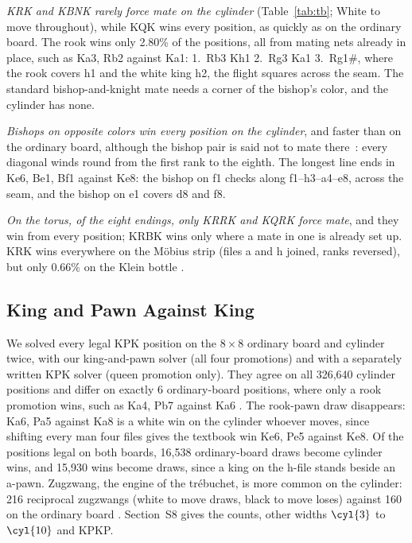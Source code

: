 \emph{KRK and KBNK rarely force mate on the cylinder} (Table~\ref{tab:tb}; White to move throughout), while KQK wins every position, as
quickly as on the ordinary board. The rook wins only 2.80\% of the positions, all from mating nets already in place, such as Ka3, Rb2 against Ka1:
1.~Rb3 Kh1 2.~Rg3 Ka1 3.~Rg1\#, where the rook covers h1 and the white king h2, the flight squares across the
seam. The standard bishop-and-knight mate needs a corner of the bishop's color, and the cylinder has none.

\emph{Bishops on opposite colors win every position on the cylinder}, and faster than on the ordinary board,
although the bishop pair is said not to mate there~\cite{HGMCylinder}: every diagonal winds round from the first
rank to the eighth. The longest line ends in Ke6, Be1, Bf1 against Ke8: the bishop on f1 checks along
f1--h3--a4--e8, across the seam, and the bishop on e1 covers d8 and f8.

\emph{On the torus, of the eight endings, only KRRK and KQRK force mate}, and they win from every position;
KRBK wins only where a mate in one is already set up. KRK wins everywhere on the M\"obius strip (files a and h
joined, ranks reversed), but only $0.66\%$ on the Klein bottle .

\subsection{King and Pawn Against King}\label{sec:kpk}

We solved every legal KPK position on the $8\times8$ ordinary board and cylinder twice, with our king-and-pawn
solver (all four promotions) and with a separately written KPK solver (queen promotion only). They agree on all
326,640 cylinder positions and differ on exactly 6 ordinary-board positions, where only a rook promotion wins,
such as Ka4, Pb7 against Ka6 . The rook-pawn draw disappears: Ka6, Pa5 against Ka8 is a white win on the
cylinder whoever moves, since shifting every man four files gives the textbook win Ke6, Pe5 against Ke8. Of the
positions legal on both boards, 16,538 ordinary-board draws become cylinder wins, and 15,930 wins become draws,
since a king on the h-file stands beside an a-pawn. Zugzwang, the engine of the tr\'ebuchet, is more common on the cylinder: 216 reciprocal zugzwangs (white
to move draws, black to move loses) against 160 on the ordinary board . Section~S8 gives the counts, other widths $\cyl{3}$ to $\cyl{10}$ and KPKP.
